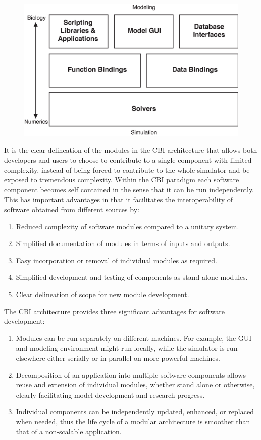 \documentclass[12pt]{article}
\begin{document}
\begin{figure}[h]
  \centering
 \includegraphics[scale=0.75]{figures/G3-CBI-Architecture-HiLevel.eps}
  \label{fig:archover}
\end{figure}

It is the clear delineation of the modules in the CBI architecture that allows both developers and users to choose to contribute to a single component with limited complexity, instead of being forced to contribute to the whole simulator and be exposed to tremendous complexity. Within the CBI paradigm each software component becomes self contained in the sense that it can be run independently. This has important advantages in that it facilitates the interoperability of software obtained from different sources by:

\begin{enumerate}
\item Reduced complexity of software modules compared to a unitary system.
\item Simplified documentation of modules in terms of inputs and outputs.
\item Easy incorporation or removal of individual modules as required.
\item Simplified development and testing of components as stand alone modules.
\item Clear delineation of scope for new module development.
\end{enumerate}

The CBI architecture provides three significant advantages for software development:

\begin{enumerate}
\item Modules can be run separately on different machines. For example, the GUI and modeling environment might run locally, while the simulator is run elsewhere either serially or in parallel on more powerful machines.
\item Decomposition of an application into multiple software components allows reuse and extension of individual modules, whether stand alone or otherwise, clearly facilitating model development and research progress.
\item Individual components can be independently updated, enhanced, or replaced when needed, thus the life cycle of a modular architecture is smoother than that of a non-scalable application.
\end{enumerate}
\end{document}
